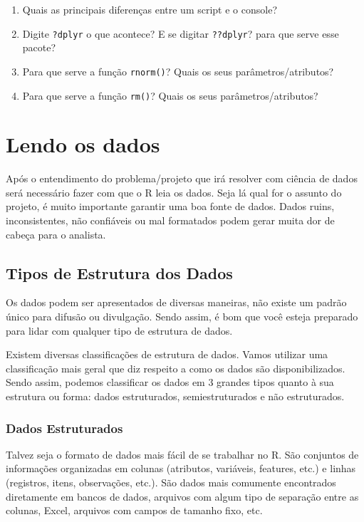 \documentclass[]{book}
\begin{document}
\begin{enumerate}
\def\labelenumi{\arabic{enumi}.}
\item
  Quais as principais diferenças entre um script e o console?
\item
  Digite \texttt{?dplyr} o que acontece? E se digitar \texttt{??dplyr}?
  para que serve esse pacote?
\item
  Para que serve a função \texttt{rnorm()}? Quais os seus
  parâmetros/atributos?
\item
  Para que serve a função \texttt{rm()}? Quais os seus
  parâmetros/atributos?
\end{enumerate}

\chapter{Lendo os dados}\label{lendo-os-dados}

Após o entendimento do problema/projeto que irá resolver com ciência de
dados será necessário fazer com que o R leia os dados. Seja lá qual for
o assunto do projeto, é muito importante garantir uma boa fonte de
dados. Dados ruins, inconsistentes, não confiáveis ou mal formatados
podem gerar muita dor de cabeça para o analista.

\section{Tipos de Estrutura dos
Dados}\label{tipos-de-estrutura-dos-dados}

Os dados podem ser apresentados de diversas maneiras, não existe um
padrão único para difusão ou divulgação. Sendo assim, é bom que você
esteja preparado para lidar com qualquer tipo de estrutura de dados.

Existem diversas classificações de estrutura de dados. Vamos utilizar
uma classificação mais geral que diz respeito a como os dados são
disponibilizados. Sendo assim, podemos classificar os dados em 3 grandes
tipos quanto à sua estrutura ou forma: dados estruturados,
semiestruturados e não estruturados.

\subsection{Dados Estruturados}\label{dados-estruturados}

Talvez seja o formato de dados mais fácil de se trabalhar no R. São
conjuntos de informações organizadas em colunas (atributos, variáveis,
features, etc.) e linhas (registros, itens, observações, etc.). São
dados mais comumente encontrados diretamente em bancos de dados,
arquivos com algum tipo de separação entre as colunas, Excel, arquivos
com campos de tamanho fixo, etc.
\end{document}
